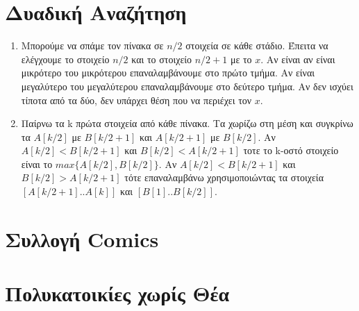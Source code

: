 \documentclass[a4paper,10pt]{article} \usepackage{anysize}
\begin{document}
\section{Δυαδική Αναζήτηση}
\renewcommand{\labelenumi}{\alph{enumi}}
\begin{enumerate}
\item Μπορούμε να σπάμε τον πίνακα σε $n/2$ στοιχεία σε κάθε στάδιο. Έπειτα να
ελέγχουμε το στοιχείο $n/2$ και το στοιχείο $n/2+1$ με το $x$. Αν είναι
αν είναι μικρότερο του μικρότερου επαναλαμβάνουμε στο πρώτο τμήμα. Αν είναι
μεγαλύτερο του μεγαλύτερου επαναλαμβάνουμε στο δεύτερο τμήμα. Αν δεν ισχύει
τίποτα από τα δύο, δεν υπάρχει θέση που να περιέχει τον $x$.
\item Παίρνω τα k πρώτα στοιχεία από κάθε πίνακα. Τα χωρίζω στη μέση και
συγκρίνω τα $A[k/2]$ με $B[k/2+1]$ και $A[k/2+1]$ με $B[k/2]$. Αν
$A[k/2]<B[k/2+1]$ και $B[k/2]<A[k/2+1]$ τοτε το k-οστό στοιχείο είναι το
$max\{A[k/2],B[k/2]\}$. Αν $A[k/2]<B[k/2+1]$ και $B[k/2]>A[k/2+1]$ τότε
επαναλαμβάνω χρησιμοποιώντας τα στοιχεία $[A[k/2+1]..A[k]]$ και
$[B[1]..B[k/2]]$.
\end{enumerate}
\section{Συλλογή Comics}
\section{Πολυκατοικίες χωρίς Θέα}
\end{document}
